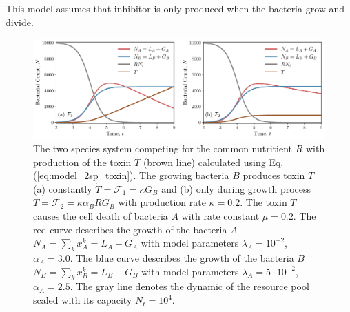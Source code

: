 \documentclass[10pt,A4paper]{article}
\begin{document}
This model assumes that inhibitor is only produced when the bacteria grow and divide.\\
%
\begin{figure}[H]
    \begin{center}
    \includegraphics[width=1.\textwidth]{Figures/pool_model_2pools_toxin.pdf}
    \caption{
        The two species system competing for the common nutritient $R$ with production of the toxin $T$ (brown line) calculated using Eq. (\ref{eq:model_2sp_toxin}).
        The growing bacteria $B$ produces toxin $T$ (a) constantly $\dot{T} = \mathcal{F}_1 = \kappa G_B$ and (b) only during growth process $\dot{T} = \mathcal{F}_2 = \kappa \alpha_B R G_B$ with 
        production rate $\kappa=0.2$.
        The toxin $T$ causes the cell death of bacteria $A$ with rate constant $\mu = 0.2$.
        The red curve describes the growth of the bacteria $A$ $N_A = \sum_{k} x_A^k = L_A+G_A$ with model parameters $\lambda_A=10^{-2}$, $\alpha_A=3.0$.
        The blue curve describes the growth of the bacteria $B$ $N_B = \sum_{k} x_B^k = L_B+G_B$ with model parameters $\lambda_A=5\cdot 10^{-2}$, $\alpha_A=2.5$.
        The gray line denotes the dynamic of the resource pool scaled with its capacity $N_t=10^4$.
    }
    \label{fig:2pool_2sp_toxin}
    \end{center}
\end{figure}
%
%
\end{document}
